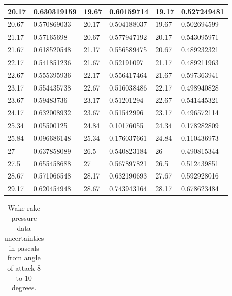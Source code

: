 \documentclass[11pt, letterpaper]{article}
\begin{document}
\begin{appendices}
\begin{table}[!ht]
\begin{tabular}{|l|l|l|l|l|l|}
        20.17 & 0.630319159 & 19.67 & 0.60159714 & 19.17 & 0.527249481 \\ \hline
        20.67 & 0.570869033 & 20.17 & 0.504188037 & 19.67 & 0.502694599 \\ \hline
        21.17 & 0.57165698 & 20.67 & 0.577947192 & 20.17 & 0.543095971 \\ \hline
        21.67 & 0.618520548 & 21.17 & 0.556589475 & 20.67 & 0.489232321 \\ \hline
        22.17 & 0.541851236 & 21.67 & 0.52191097 & 21.17 & 0.489211963 \\ \hline
        22.67 & 0.555395936 & 22.17 & 0.556417464 & 21.67 & 0.597363941 \\ \hline
        23.17 & 0.554435738 & 22.67 & 0.516038486 & 22.17 & 0.498940828 \\ \hline
        23.67 & 0.59483736 & 23.17 & 0.51201294 & 22.67 & 0.541445321 \\ \hline
        24.17 & 0.632008932 & 23.67 & 0.51542996 & 23.17 & 0.496572114 \\ \hline
        25.34 & 0.05500125 & 24.84 & 0.10176055 & 24.34 & 0.178282809 \\ \hline
        25.84 & 0.096686148 & 25.34 & 0.176037661 & 24.84 & 0.110436973 \\ \hline
        27 & 0.637858089 & 26.5 & 0.540823184 & 26 & 0.490815344 \\ \hline
        27.5 & 0.655458688 & 27 & 0.567897821 & 26.5 & 0.512439851 \\ \hline
        28.67 & 0.571066548 & 28.17 & 0.632190693 & 27.67 & 0.592928016 \\ \hline
        29.17 & 0.620454948 & 28.67 & 0.743943164 & 28.17 & 0.678623484 \\ \hline
    \end{tabular}
\end{table}

\begin{table}[!ht]
    \centering
    \caption{Wake rake pressure data uncertainties in pascals from angle of attack 8 to 10 degrees.}
    \begin{tabular}{|l|l|l|l|l|l|}
    

\end{tabular}
\end{table}
\end{appendices}
\end{document}

